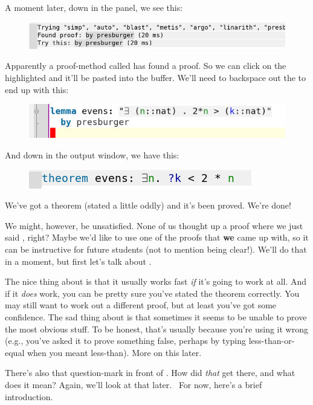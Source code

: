 A moment later, down in the  panel, we see this:
\begin{figure}[H]
    \includegraphics[width=0.75\linewidth]{TEXT/C01//Images/try0-results.png}
\end{figure}

Apparently a proof-method called  has found a proof. So we can click on the highlighted  and it'll be pasted into the buffer. We'll need to backspace out the  to end up with this:
\begin{figure}[h]
    \includegraphics[width=0.5\linewidth]{TEXT/C01/Images/first-proof.png}
\end{figure}
And down in the output window, we have this:
\begin{figure}[h]
    \includegraphics[width=0.5\linewidth]{TEXT/C01/Images/output-first-proof.png}
\end{figure}

We've got a theorem (stated a little oddly) and it's been proved. We're done! 

We might, however, be unsatisfied. None of us thought up a proof where we just said , right? Maybe we'd like to use one of the proofs that \textbf{we} came up with, so it can be instructive for future students (not to mention being clear!). We'll do that in a moment, but first let's talk about .

The nice thing about  is that it usually works fast \textit{if} it's going to work at all. And if it \textit{does} work, you can be pretty sure you've stated the theorem correctly. You may still want to work out a different proof, but at least you've got some confidence. The sad thing about  is that sometimes it seems to be unable to prove the most obvious stuff. To be honest, that's usually because you're using it wrong (e.g., you've asked it to prove something false, perhaps by typing less-than-or-equal when you meant less-than). More on this later. 

There's also that question-mark in front of . How did \textit{that} get there, and what does it mean? Again, we'll look at that later.  For now, here's a brief introduction.

